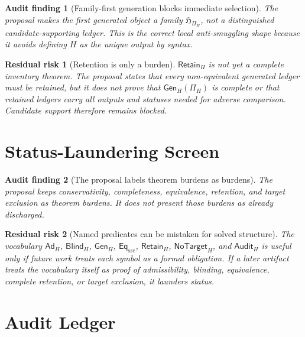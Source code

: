 \documentclass[11pt]{article}
\newcommand{\LedgerFam}{\mathfrak{H}}
\newcommand{\PiH}{\Pi_H}
\newcommand{\AdH}{\mathsf{Ad}_{H}}
\newcommand{\BlindH}{\mathsf{Blind}_{H}}
\newcommand{\GenH}{\mathsf{Gen}_{H}}
\newcommand{\EqSrc}{\mathsf{Eq}_{\mathrm{src}}}
\newcommand{\RetainH}{\mathsf{Retain}_{H}}
\newcommand{\NoTargetH}{\mathsf{NoTarget}_{H}}
\newcommand{\AuditH}{\mathsf{Audit}_{H}}
\newtheorem{auditfinding}{Audit finding}
\newtheorem{residualrisk}{Residual risk}
\begin{document}
\begin{auditfinding}[Family-first generation blocks immediate selection]
The proposal makes the first generated object a family
\(\LedgerFam_{\PiH}\), not a distinguished candidate-supporting ledger.
This is the correct local anti-smuggling shape because it avoids defining
\(H\) as the unique output by syntax.
\end{auditfinding}

\begin{residualrisk}[Retention is only a burden]
\(\RetainH\) is not yet a complete inventory theorem. The proposal states
that every non-equivalent generated ledger must be retained, but it does not
prove that \(\GenH(\Pi_H)\) is complete or that retained ledgers carry all
outputs and statuses needed for adverse comparison. Candidate support
therefore remains blocked.
\end{residualrisk}

\section{Status-Laundering Screen}

\begin{auditfinding}[The proposal labels theorem burdens as burdens]
The proposal keeps conservativity, completeness, equivalence, retention, and
target exclusion as theorem burdens. It does not present those burdens as
already discharged.
\end{auditfinding}

\begin{residualrisk}[Named predicates can be mistaken for solved structure]
The vocabulary \(\AdH\), \(\BlindH\), \(\GenH\), \(\EqSrc\), \(\RetainH\),
\(\NoTargetH\), and \(\AuditH\) is useful only if future work treats each
symbol as a formal obligation. If a later artifact treats the vocabulary
itself as proof of admissibility, blinding, equivalence, complete retention,
or target exclusion, it launders status.
\end{residualrisk}

\section{Audit Ledger}
\end{document}
